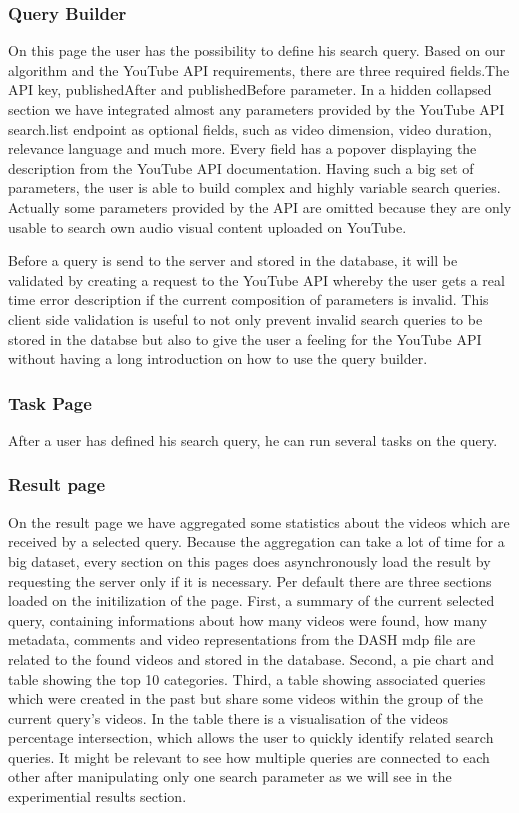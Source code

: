 \subsubsection{Query Builder}
On this page the user has the possibility to define his search query. Based on our algorithm and the YouTube API requirements, there are
three required fields.The API key, publishedAfter and publishedBefore parameter.
In a hidden collapsed section we have integrated almost any parameters provided by the YouTube API search.list endpoint as optional fields, 
such as video dimension, video duration, relevance language and much more. Every field has a popover displaying the description from the YouTube
API documentation.
Having such a big set of parameters, the user is able to build complex and highly variable search queries.
Actually some parameters provided by the API are omitted because they are only usable to search own audio visual content uploaded on YouTube.

Before a query is send to the server and stored in the database, it will be validated by creating a request to the YouTube API whereby
the user gets a real time error description if the current composition of parameters is invalid. This client side validation is useful 
to not only prevent invalid search queries to be stored in the databse but also to give the user a feeling for the YouTube API without having
a long introduction on how to use the query builder.

\subsubsection{Task Page}
After a user has defined his search query, he can run several tasks on the query.


\subsubsection{Result page}
On the result page we have aggregated some statistics about the videos which are received by a selected query. 
Because the aggregation can take a lot of time for a big dataset, every section on this pages does asynchronously load the result by 
requesting the server only if it is necessary. Per default there are three sections loaded on the initilization of the page. 
First, a summary of the current selected query, containing informations about how many videos were found, how many
metadata, comments and video representations from the DASH mdp file are related to the found videos and stored in the database. 
Second, a pie chart and table showing the top 10 categories. Third, a table showing 
associated queries which were created in the past but share some videos within the group of the current query's videos.
In the table there is a visualisation of the videos percentage intersection, which allows
the user to quickly identify related search queries. It might be relevant to see how multiple queries are connected to each other after
manipulating only one search parameter as we will see in the experimential results section.

